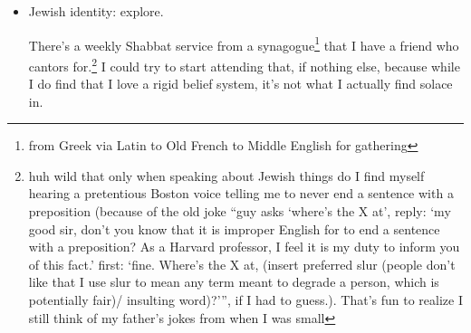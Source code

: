 \documentclass[12pt]{article}
\newcommand{\say}[1]{``#1''}
\newcommand{\nsay}[1]{`#1'}
\renewcommand{\,}{\textsuperscript{,}}
\begin{document}
\begin{itemize}
The prayer for St. Michael might be a good one?  
Let's see, the text goes something like:\footnote{from memory, given that I did set it to music and win an award for the setting, I should remember it (to say nothing of the many times I said it myself)}

St. Michael the Archangel\footnote{I think capital}, defend us in battle. Be our protection against the wickedness and snares of the devil. May G-d rebuke him, we humbly pray, and do thou, oh prince of the heavenly host, by the power of G-d, cast\footnote{or thrust, or many other words} into Hell Satan and all the evil spirits\footnote{or ghosts, which is the version I used in my setting because syllables} that prowl about the world, seeking the ruin of souls.

Looking at \href{https://www.ewtn.com/catholicism/devotions/prayer-to-st-michael-the-archangel-371}{EWTN}, they use \say{defense} instead of \say{protection}, \say{heavenly hosts} plural not singular, \say{thrust} instead of \say{cast} (which I also have used in the past at times).  
Woot! I do have a memory still.

Apparently there are three daily Jewish prayers, though that seems as though it may be more of a communal activity.  
Alas, I have not explored my Jewish side as much as I might.

\item Jewish identity: explore.

There's a weekly Shabbat service from a synagogue\footnote{from Greek via Latin to Old French to Middle English for gathering} that I have a friend who cantors for.\footnote{huh wild that only when speaking about Jewish things do I find myself hearing a pretentious Boston voice telling me to never end a sentence with a preposition (because of the old joke \say{guy asks \nsay{where's the X at}, reply: \nsay{my good sir, don't you know that it is improper English for to end a sentence with a preposition? As a Harvard professor, I feel it is my duty to inform you of this fact.} first: \nsay{fine. Where's the X at, (insert preferred slur (people don't like that I use slur to mean any term meant to degrade a person, which is potentially fair)/ insulting word)?}}, if I had to guess.). That's fun to realize I still think of my father's jokes from when I was small}  
I could try to start attending that, if nothing else, because while I do find that I love a rigid belief system, it's not what I actually find solace in.

\end{itemize}
\end{document}

